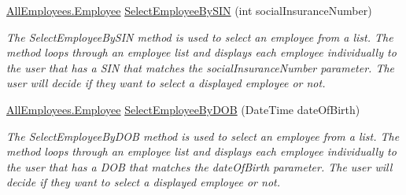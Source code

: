 \begin{DoxyCompactItemize}
\hyperlink{class_all_employees_1_1_employee}{All\+Employees.\+Employee} \hyperlink{class_the_company_1_1_container_ad0f416f961bbc66bb160d00f33279d4d}{Select\+Employee\+By\+S\+I\+N} (int social\+Insurance\+Number)
\begin{DoxyCompactList}\small\item\em The Select\+Employee\+By\+S\+I\+N method is used to select an employee from a list. The method loops through an employee list and displays each employee individually to the user that has a S\+I\+N that matches the social\+Insurance\+Number parameter. The user will decide if they want to select a displayed employee or not. \end{DoxyCompactList}\item 
\hyperlink{class_all_employees_1_1_employee}{All\+Employees.\+Employee} \hyperlink{class_the_company_1_1_container_a6941dad941fbf4b61ff2c26c083066e3}{Select\+Employee\+By\+D\+O\+B} (Date\+Time date\+Of\+Birth)
\begin{DoxyCompactList}\small\item\em The Select\+Employee\+By\+D\+O\+B method is used to select an employee from a list. The method loops through an employee list and displays each employee individually to the user that has a D\+O\+B that matches the date\+Of\+Birth parameter. The user will decide if they want to select a displayed employee or not. \end{DoxyCompactList}\end{DoxyCompactItemize}
